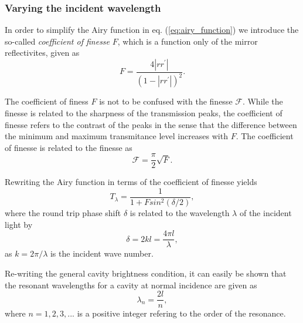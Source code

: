 \subsubsection{Varying the incident wavelength}

In order to simplify the Airy function in eq. (\ref{eq:airy_function}) we introduce the so-called \emph{coefficient of finesse} $F$, which is a function only of the mirror reflectivites, given as
\begin{equation}
    F = \frac{4 |rr^{\prime}|}{(1-|rr^{\prime}|)^2}.
\end{equation}

The coefficient of finess $F$ is not to be confused with the finesse $\mathcal{F}$. While the finesse is related to the sharpness of the transmission peaks, the coefficient of finesse refers to the contrast of the peaks in the sense that the difference between the minimum and maximum transmitance level increases with $F$. The coefficient of finesse is related to the finesse as 
\begin{equation}
    \mathcal{F} = \frac{\pi}{2} \sqrt{F}.
\end{equation}

Rewriting the Airy function in terms of the coefficient of finesse yields
\begin{equation}
    T_{\lambda} = \frac{1}{1+ F sin^2 \left(\delta / 2\right)},
    \label{eq:simplified_airy_function}
\end{equation}
where the round trip phase shift $\delta$ is related to the wavelength $\lambda$ of the incident light by
\begin{equation}
    \delta = 2kl = \frac{4 \pi l }{\lambda},
\end{equation}
as $k = 2 \pi / \lambda$ is the incident wave number.

Re-writing the general cavity brightness condition, it can easily be shown that the resonant wavelengths for a cavity at normal incidence are given as
\begin{equation}
    \lambda_n = \frac{2l}{n},
\end{equation}
where $n=1,2,3,...$ is a positive integer refering to the order of the resonance. 


